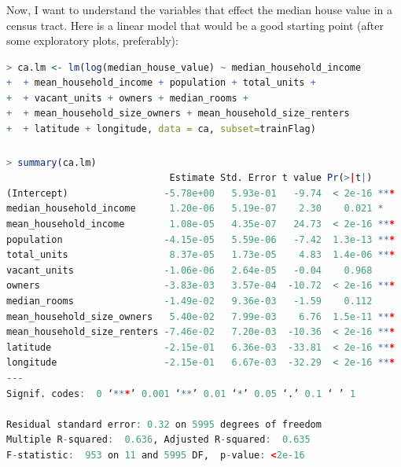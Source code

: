 \documentclass[xetex,mathserif,serif,aspectratio=169]{beamer}
\begin{document}
\begin{frame}[fragile] \frametitle{} \oldB \small

Now, I want to understand the variables that effect the
median house value in a census tract. Here is a linear
model that would be a good starting point (after some
exploratory plots, preferably):
\begin{lstlisting}[language=R, basicstyle=\fontsize{8pt}{10pt}\selectfont\ttfamily]
> ca.lm <- lm(log(median_house_value) ~ median_household_income
+  + mean_household_income + population + total_units +
+  + vacant_units + owners + median_rooms +
+  + mean_household_size_owners + mean_household_size_renters
+  + latitude + longitude, data = ca, subset=trainFlag)
\end{lstlisting}

\end{frame}


\begin{frame}[fragile] \frametitle{} \oldB \small

\begin{lstlisting}[language=R, basicstyle=\fontsize{8pt}{10pt}\selectfont\ttfamily]
> summary(ca.lm)
                             Estimate Std. Error t value Pr(>|t|)
(Intercept)                 -5.78e+00   5.93e-01   -9.74  < 2e-16 ***
median_household_income      1.20e-06   5.19e-07    2.30    0.021 *
mean_household_income        1.08e-05   4.35e-07   24.73  < 2e-16 ***
population                  -4.15e-05   5.59e-06   -7.42  1.3e-13 ***
total_units                  8.37e-05   1.73e-05    4.83  1.4e-06 ***
vacant_units                -1.06e-06   2.64e-05   -0.04    0.968
owners                      -3.83e-03   3.57e-04  -10.72  < 2e-16 ***
median_rooms                -1.49e-02   9.36e-03   -1.59    0.112
mean_household_size_owners   5.40e-02   7.99e-03    6.76  1.5e-11 ***
mean_household_size_renters -7.46e-02   7.20e-03  -10.36  < 2e-16 ***
latitude                    -2.15e-01   6.36e-03  -33.81  < 2e-16 ***
longitude                   -2.15e-01   6.67e-03  -32.29  < 2e-16 ***
---
Signif. codes:  0 ‘***’ 0.001 ‘**’ 0.01 ‘*’ 0.05 ‘.’ 0.1 ‘ ’ 1

Residual standard error: 0.32 on 5995 degrees of freedom
Multiple R-squared:  0.636, Adjusted R-squared:  0.635
F-statistic:  953 on 11 and 5995 DF,  p-value: <2e-16
\end{lstlisting}

\end{frame}
\end{document}
